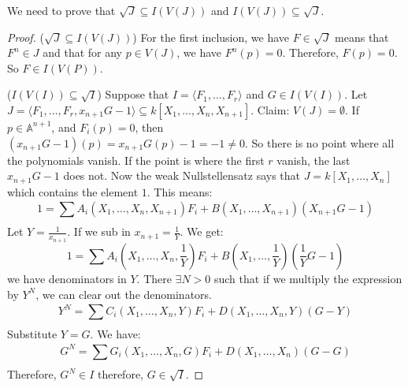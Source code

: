 \documentclass{report}
\begin{document}
We need to prove that $\sqrt{J} \subseteq I(V(J))$ and $I(V(J)) \subseteq \sqrt{J}$.
    \begin{proof}
        ($\sqrt{J} \subseteq I(V(J))$) For the first inclusion, we have $F \in \sqrt{J}$ means that $F^{n} \in J$ and that for any $p \in V(J)$, we have $F^{n}(p) = 0$. Therefore, $F(p) = 0$. So $F \in I(V(P))$.

        ($I(V(I)) \subseteq \sqrt{I}$) Suppose that $I = \langle F_{1}, \ldots, F_{r} \rangle$ and $G \in I(V(I))$. Let $J = \langle F_{1}, \ldots, F_{r}, x_{n + 1}G - 1 \rangle \subseteq k[X_{1}, \ldots, X_{n}, X_{n + 1}]$. Claim: $V(J) = \emptyset$. If $p \in \mathbb{A}^{n + 1}$, and $F_{i}(p) = 0$, then $(x_{n + 1}G - 1)(p) = x_{n + 1}G(p) - 1 = -1 \neq 0$. So there is no point where all the polynomials vanish. If the point is where the first $r$ vanish, the last $x_{n + 1}G - 1$ does not. Now the weak Nullstellensatz says that $J = k[X_{1}, \ldots, X_{n}]$ which contains the element $1$. This means:
            \begin{equation*}
                1 = \sum_{}^{} A_{i}(X_{1}, \ldots, X_{n}, X_{n + 1})F_{i} + B(X_{1}, \ldots, X_{n + 1})(X_{n + 1}G - 1)
            \end{equation*}
        Let $Y = \frac{1}{x_{n + 1}}$. If we sub in $x_{n + 1} = \frac{1}{Y}$. We get:
            \begin{equation*}
                1 = \sum_{}^{} A_{i}(X_{1}, \ldots, X_{n}, \dfrac{1}{Y})F_{i} + B(X_{1}, \ldots, \dfrac{1}{Y})(\dfrac{1}{Y}G - 1)
            \end{equation*}
        we have denominators in $Y$. There $\exists N > 0$ such that if we multiply the expression by $Y^{N}$, we can clear out the denominators. 
            \begin{equation*}
                Y^{N} = \sum_{}^{} C_{i}(X_{1}, \ldots, X_{n}, Y)F_{i} + D(X_{1}, \ldots, X_{n}, Y)(G - Y)
            \end{equation*}
        Substitute $Y = G$. We have:
            \begin{equation*}
                G^{N} = \sum_{}^{} G_{i}(X_{1}, \ldots, X_{n}, G)F_{i} + D(X_{1}, \ldots, X_{n})(G - G)
            \end{equation*}
        Therefore, $G^{N} \in I$ therefore, $G \in \sqrt{I}$.
    \end{proof}
\end{document}
